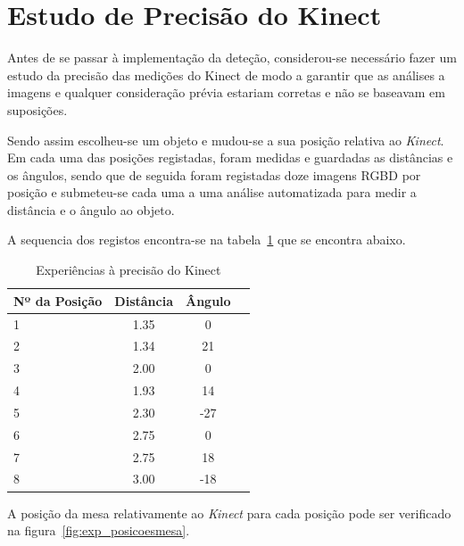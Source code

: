 \section{Estudo de Precisão do Kinect}

Antes de se passar à implementação da deteção, considerou-se necessário fazer um estudo da precisão das medições do Kinect de modo a garantir que as análises a imagens e qualquer consideração prévia estariam corretas e não se baseavam em suposições.

Sendo assim escolheu-se um objeto e mudou-se a sua posição relativa ao \emph{Kinect}. Em cada uma das posições registadas, foram medidas e guardadas as distâncias e os ângulos, sendo que de seguida foram registadas doze imagens RGBD por posição e submeteu-se cada uma a uma análise automatizada para medir a distância e o ângulo ao objeto.

A sequencia dos registos encontra-se na tabela~\ref{res:dist_analise} que se encontra abaixo.

\begin{table}[htb]
	\begin{center}
		\begin{tabular} { l c c c}
			Nº da Posição & Distância & Ângulo \\
			\hline
			1 & 1.35 & 0 \\
			2 &  1.34 & 21\\
			3 & 2.00 & 0 \\
			4 & 1.93 & 14 \\
			5 & 2.30 & -27\\
			6 & 2.75 & 0 \\
			7 & 2.75 & 18 \\
			8 & 3.00 & -18 \\
			\hline
		\end{tabular}
		\caption{Experiências à precisão do Kinect}
		\label{res:dist_analise}
	\end{center}
\end{table}

A posição da mesa relativamente ao \emph{Kinect} para cada posição pode ser verificado na figura~\ref{fig:exp_posicoesmesa}.

